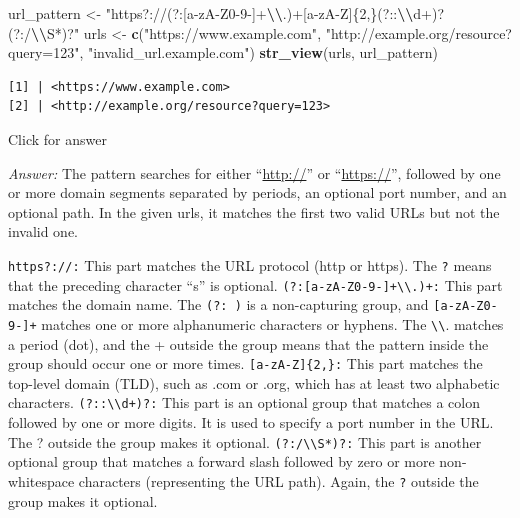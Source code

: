 \documentclass[
]{book}
\newenvironment{Shaded}{\begin{snugshade}}{\end{snugshade}}
\newcommand{\FunctionTok}[1]{\textcolor[rgb]{0.13,0.29,0.53}{\textbf{#1}}}
\newcommand{\NormalTok}[1]{#1}
\newcommand{\OtherTok}[1]{\textcolor[rgb]{0.56,0.35,0.01}{#1}}
\newcommand{\SpecialCharTok}[1]{\textcolor[rgb]{0.81,0.36,0.00}{\textbf{#1}}}
\newcommand{\StringTok}[1]{\textcolor[rgb]{0.31,0.60,0.02}{#1}}
\begin{document}
\begin{Shaded}
\begin{Highlighting}[]
\NormalTok{url\_pattern }\OtherTok{\textless{}{-}} \StringTok{"https?://(?:[a{-}zA{-}Z0{-}9{-}]+}\SpecialCharTok{\textbackslash{}\textbackslash{}}\StringTok{.)+[a{-}zA{-}Z]\{2,\}(?::}\SpecialCharTok{\textbackslash{}\textbackslash{}}\StringTok{d+)?(?:/}\SpecialCharTok{\textbackslash{}\textbackslash{}}\StringTok{S*)?"}
\NormalTok{urls }\OtherTok{\textless{}{-}} \FunctionTok{c}\NormalTok{(}\StringTok{"https://www.example.com"}\NormalTok{, }\StringTok{"http://example.org/resource?query=123"}\NormalTok{, }\StringTok{"invalid\_url.example.com"}\NormalTok{)}
\FunctionTok{str\_view}\NormalTok{(urls, url\_pattern)}
\end{Highlighting}
\end{Shaded}

\begin{verbatim}
[1] | <https://www.example.com>
[2] | <http://example.org/resource?query=123>
\end{verbatim}

Click for answer

\emph{Answer:} The pattern searches for either ``\url{http://}'' or ``\url{https://}'', followed by one or more domain segments separated by periods, an optional port number, and an optional path. In the given urls, it matches the first two valid URLs but not the invalid one.

\texttt{https?://:} This part matches the URL protocol (http or https). The \texttt{?} means that the preceding character ``s'' is optional.
\texttt{(?:{[}a-zA-Z0-9-{]}+\textbackslash{}\textbackslash{}.)+:} This part matches the domain name. The \texttt{(?:\ )} is a non-capturing group, and \texttt{{[}a-zA-Z0-9-{]}+} matches one or more alphanumeric characters or hyphens. The \texttt{\textbackslash{}\textbackslash{}}. matches a period (dot), and the + outside the group means that the pattern inside the group should occur one or more times. \texttt{{[}a-zA-Z{]}\{2,\}:} This part matches the top-level domain (TLD), such as .com or .org, which has at least two alphabetic characters. \texttt{(?::\textbackslash{}\textbackslash{}d+)?:} This part is an optional group that matches a colon followed by one or more digits. It is used to specify a port number in the URL. The ? outside the group makes it optional. \texttt{(?:/\textbackslash{}\textbackslash{}S*)?:} This part is another optional group that matches a forward slash followed by zero or more non-whitespace characters (representing the URL path). Again, the \texttt{?} outside the group makes it optional.
\end{document}
